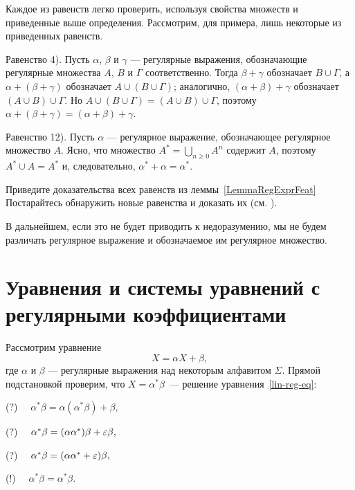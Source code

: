 \begin{myproof}
Каждое из равенств легко проверить, используя свойства множеств и приведенные выше определения. Рассмотрим, для примера, лишь некоторые из приведенных равенств.

Равенство 4). Пусть $\alpha$, $\beta$ и $\gamma$ --- регулярные выражения, обозначающие регулярные множества $A$, $B$ и $\Gamma$ соответственно. Тогда $\beta+\gamma$ обозначает $B \cup \Gamma$, а $\alpha+(\beta+\gamma)$ обозначает $A \cup (B \cup \Gamma)$; аналогично, $(\alpha+\beta)+\gamma$ обозначает $(A \cup B)\cup\Gamma$. Но $A \cup (B \cup \Gamma) = (A \cup B) \cup \Gamma$, поэтому $\alpha+(\beta+\gamma)=(\alpha+\beta)+\gamma$.

Равенство 12). Пусть $\alpha$ --- регулярное выражение, обозначающее регулярное множество $A$. Ясно, что множество $A^*= \bigcup_{n\ge 0}A^n$ содержит $A$, поэтому $A^*\cup A=A^*$ и, следовательно, $\alpha^*+\alpha=\alpha^*$.
\end{myproof}

\begin{myproblem}
Приведите доказательства всех равенств из леммы~\ref{LemmaRegExprFeat} Постарайтесь обнаружить новые равенства и доказать их (см. \cite{Sal}).
\end{myproblem}

В дальнейшем, если это не будет приводить к недоразумению, мы не будем различать регулярное выражение и обозначаемое им регулярное множество.

\section{Уравнения и системы уравнений с регулярными коэффициентами}
\label{Chapter2Systems}

Рассмотрим уравнение
\begin{equation}\label{lin-reg-eq}
    X=\alpha X+\beta,
\end{equation}
где $\alpha$ и $\beta$ --- регулярные выражения над некоторым
алфавитом $\Sigma$. Прямой подстановкой проверим, что
$X=\alpha^*\beta$~--- решение уравнения~\eqref{lin-reg-eq}:

(?)	$\quad \alpha^*\beta=\alpha(\alpha^*\beta)+\beta,$

(?) $\quad \alpha^*\beta=(\alpha\alpha^*)\beta+\varepsilon\beta,$

(?)	$\quad \alpha^*\beta=(\alpha\alpha^*+\varepsilon)\beta,$

(!)	$\quad \alpha^*\beta=\alpha^*\beta.$

